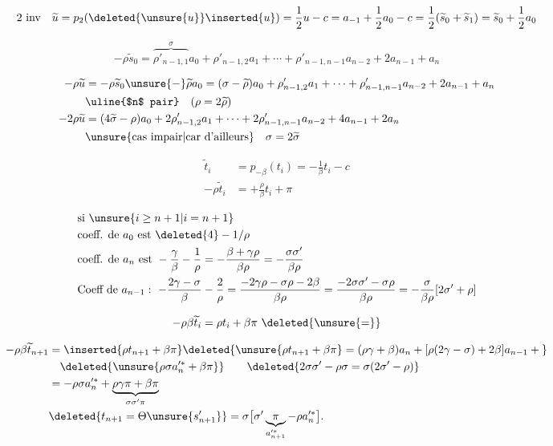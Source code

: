 \[
\text{2 inv}\quad
\widetilde{u}=p_2(\deleted{\unsure{u}}\inserted{u})=\frac12u-c
=a_{-1}+\frac12a_0-c=\frac12(\widetilde{s}_0+\widetilde{s}_1)
=\widetilde{s}_0+\frac12a_0
\]

\[
\boxed{-\rho\widetilde{s}_0=
 \overbrace{\rho'_{n-1,1}}^\sigma a_0+\rho'_{n-1,2}a_1+
 \cdots+\rho'_{n-1,n-1}a_{n-2}+2a_{n-1}+a_n}
\]

\[
\begin{aligned}
-\rho\widetilde{u}&=-\rho\widetilde{s}_0\unsure{-}\widetilde{\rho}a_0
=(\sigma-\widetilde{\rho})a_0+\rho'_{n-1,2}a_1+\cdots+
 \rho'_{n-1,n-1}a_{n-2}+2a_{n-1}+a_n\\
&\hfill\text{\uline{$n$ pair}}\quad(\rho=2\widetilde{\rho})\\
-2\rho\widetilde{u}&=(4\widetilde{\sigma}-\rho)a_0+2\rho'_{n-1,2}a_1+\cdots+
 2\rho'_{n-1,n-1}a_{n-2}+4a_{n-1}+2a_n\\
&\hfill\text{\unsure{cas impair|car d'ailleurs}}\quad\sigma=2\widetilde{\sigma}
\end{aligned}
\]

\[
\begin{aligned}
\widetilde{t}_i&=p_{-\beta}(t_i)=-\frac1{\beta}t_i-c\\
-\rho\widetilde{t}_i&=+\frac{\rho}{\beta}t_i+\pi
\end{aligned}
\]

\[
\begin{aligned}
&\text{si }\unsure{i\ge n+1|i=n+1}\\
&\text{coeff. de }a_0\text{ est }\deleted{4}-1/\rho\\
&\text{coeff. de }a_n\text{ est }-\frac{\gamma}{\beta}-\frac1\rho
=-\frac{\beta+\gamma\rho}{\beta\rho}=-\frac{\sigma\sigma'}{\beta\rho}\\
&\text{Coeff de }a_{n-1}:\ -\frac{2\gamma-\sigma}{\beta}-\frac2\rho
=\frac{-2\gamma\rho-\sigma\rho-2\beta}{\beta\rho}
=\frac{-2\sigma\sigma'-\sigma\rho}{\beta\rho}
=-\frac{\sigma}{\beta\rho}[2\sigma'+\rho]
\end{aligned}
\]

\[
-\rho\beta\widetilde{t}_i=\rho t_i+\beta\pi\ \deleted{\unsure{=}}
\]

\[
\begin{aligned}
-\rho\beta\widetilde{t}_{n+1}
&=\inserted{\rho t_{n+1}+\beta\pi}
 \deleted{\unsure{\rho t_{n+1}+\beta\pi}=(\rho\gamma+\beta)a_n+
 [\rho(2\gamma-\sigma)+2\beta]a_{n-1}+{}}\\
&\quad\deleted{\unsure{\rho\sigma a_n^{\prime *}+\beta\pi}}
 \qquad\deleted{2\sigma\sigma'-\rho\sigma=\sigma(2\sigma'-\rho)}\\
&=-\rho\sigma a_n^{\prime *}+\underbrace{\rho\gamma\pi+\beta\pi}_{\sigma\sigma'\pi}\\
&\deleted{t_{n+1}=\Theta \unsure{s'_{n+1}}}
=\sigma\bigl[\sigma'\underbrace{\pi}_{a_{n+1}^{\prime *}}-\rho a_n^{\prime *}\bigr].
\end{aligned}
\]

